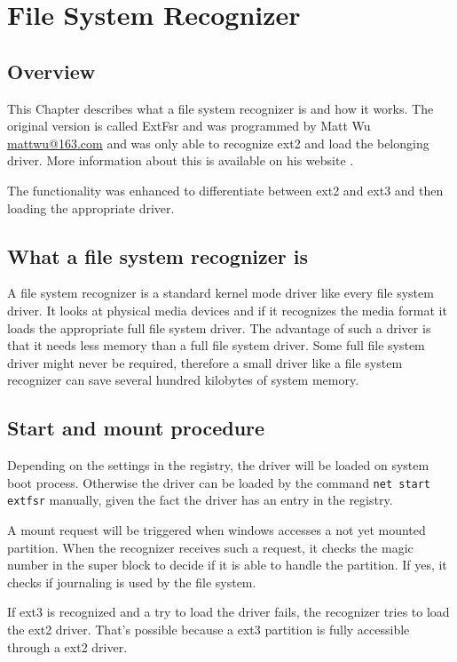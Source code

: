 \chapter{File System Recognizer}
\label{cha:fileSystemRecognizer}

\section{Overview}
This Chapter describes what a file system recognizer is and how it works. The original version is called ExtFsr and was programmed by Matt Wu \href{mailto:mattwu@163.com}{mattwu@163.com} and was only able to recognize ext2 and load the belonging driver. More information about this is available on his website \cite{ext2fsd}.

The functionality was enhanced to differentiate between ext2 and ext3 and then loading the appropriate driver.

\section{What a file system recognizer is}
A file system recognizer is a standard kernel mode driver like every file system driver. It looks at physical media devices and if it recognizes the media format it loads the appropriate full file system driver. The advantage of such a driver is that it needs less memory than a full file system driver. Some full file system driver might never be required, therefore a small driver like a file system recognizer can save several hundred kilobytes of system memory.

\section{Start and mount procedure}
Depending on the settings in the registry, the driver will be loaded on system boot process. Otherwise the driver can be loaded by the command \verb~net start extfsr~ manually, given the fact the driver has an entry in the registry.

A mount request will be triggered when windows accesses a not yet mounted partition. When the recognizer receives such a request, it checks the magic number in the super block to decide if it is able to handle the partition. If yes, it checks if journaling is used by the file system.

If ext3 is recognized and a try to load the driver fails, the recognizer tries to load the ext2 driver. That's possible because a ext3 partition is fully accessible through a ext2 driver.

